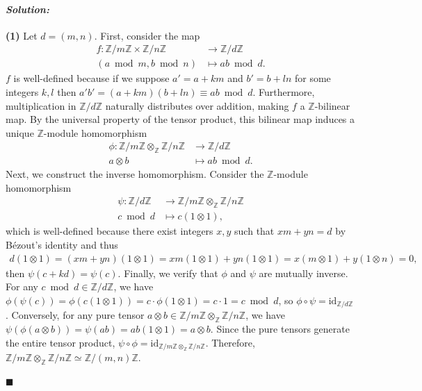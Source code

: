 \documentclass[12pt, a4paper]{article}
\newenvironment{solution}
  {\paragraph{\textit{Solution:}}\par\medskip}
  {\hfill$\blacksquare$\vspace{0.1cm}}
\begin{document}
\begin{solution}
    \textbf{(1)}
    Let $d = (m,n)$. First, consider the map
    \begin{align*}
        f: \mathbb{Z}/m\mathbb{Z} \times \mathbb{Z}/n\mathbb{Z} &\to \mathbb{Z}/d\mathbb{Z} \\
        (a\bmod m, b\bmod n) &\mapsto ab\bmod d.
    \end{align*}
    $f$ is well-defined because if we suppose $a' = a + km$ and $b' = b + ln$ for some integers $k, l$ then $a'b' = (a + km)(b + ln) \equiv ab \bmod d$. 
    Furthermore, multiplication in $\mathbb{Z}/d\mathbb{Z}$ naturally distributes over addition, making $f$ a $\mathbb{Z}$-bilinear map. 
    By the universal property of the tensor product, this bilinear map induces a unique $\mathbb{Z}$-module homomorphism
    \begin{align*}
        \phi: \mathbb{Z}/m\mathbb{Z} \otimes_{\mathbb{Z}} \mathbb{Z}/n\mathbb{Z} &\to \mathbb{Z}/d\mathbb{Z}\\
        a \otimes b &\mapsto ab \bmod d.
    \end{align*}
    Next, we construct the inverse homomorphism. 
    Consider the $\mathbb{Z}$-module homomorphism 
    \begin{align*}
        \psi:\mathbb{Z}/d\mathbb{Z} &\to \mathbb{Z}/m\mathbb{Z} \otimes_{\mathbb{Z}} \mathbb{Z}/n\mathbb{Z}\\
        c \bmod d&\mapsto c(1 \otimes 1),
    \end{align*}
    which is well-defined because there exist integers $x,y$ such that $xm+yn=d$ by Bézout's identity and thus
    \begin{align*}
        d(1 \otimes 1) = (xm + yn)(1 \otimes 1) = xm(1 \otimes 1) + yn(1 \otimes 1)= x(m \otimes 1) + y(1 \otimes n)=0,
    \end{align*}
    then $\psi(c+kd) = \psi(c)$.
    Finally, we verify that $\phi$ and $\psi$ are mutually inverse. For any $c \bmod d \in \mathbb{Z}/d\mathbb{Z}$, we have $\phi(\psi(c)) = \phi(c(1 \otimes 1)) = c \cdot \phi(1 \otimes 1) = c \cdot 1 = c \bmod d$,
     so $\phi \circ \psi = \text{id}_{\mathbb{Z}/d\mathbb{Z}}$. Conversely, for any pure tensor $a \otimes b \in \mathbb{Z}/m\mathbb{Z} \otimes_{\mathbb{Z}} \mathbb{Z}/n\mathbb{Z}$, we have $\psi(\phi(a \otimes b)) = \psi(ab) = ab(1 \otimes 1) = a \otimes b$. 
     Since the pure tensors generate the entire tensor product, $\psi \circ \phi = \text{id}_{\mathbb{Z}/m\mathbb{Z} \otimes_{\mathbb{Z}} \mathbb{Z}/n\mathbb{Z}}$. Therefore, $\mathbb{Z}/m\mathbb{Z} \otimes_{\mathbb{Z}} \mathbb{Z}/n\mathbb{Z} \simeq \mathbb{Z}/(m,n)\mathbb{Z}$.


\end{solution}
\end{document}
